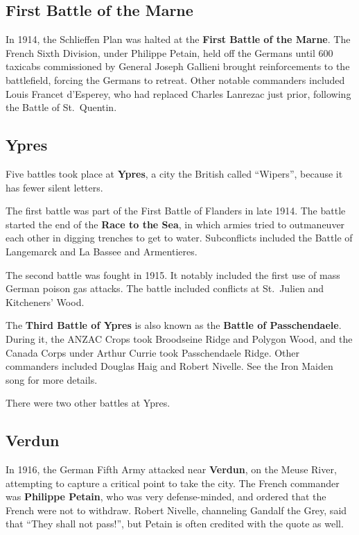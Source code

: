 \subsection*{First Battle of the Marne}

In 1914, the Schlieffen Plan was halted at the \textbf{First Battle of the Marne}.
The French Sixth Division, under Philippe Petain,
held off the Germans until 600 taxicabs commissioned by General Joseph Gallieni
brought reinforcements to the battlefield,
forcing the Germans to retreat.
Other notable commanders included Louis Francet d'Esperey,
who had replaced Charles Lanrezac just prior, following the Battle of St.\ Quentin.

\subsection*{Ypres}

Five battles took place at \textbf{Ypres}, a city the British called ``Wipers'',
because it has fewer silent letters.

The first battle was part of the First Battle of Flanders in late 1914.
The battle started the end of the \textbf{Race to the Sea},
in which armies tried to outmaneuver each other in digging trenches to get to water.
Subconflicts included the Battle of Langemarck and La Bassee and Armentieres.

The second battle was fought in 1915.
It notably included the first use of mass German poison gas attacks.
The battle included conflicts at St.\ Julien and Kitcheners' Wood.

The \textbf{Third Battle of Ypres} is also known as the \textbf{Battle of Passchendaele}.
During it, the ANZAC Crops took Broodseine Ridge and Polygon Wood,
and the Canada Corps under Arthur Currie took Passchendaele Ridge.
Other commanders included Douglas Haig and Robert Nivelle.
See the Iron Maiden song for more details.

There were two other battles at Ypres.

\subsection*{Verdun}

In 1916, the German Fifth Army attacked near \textbf{Verdun}, on the Meuse River,
attempting to capture a critical point to take the city.
The French commander was \textbf{Philippe Petain}, who was very defense-minded,
and ordered that the French were not to withdraw.
Robert Nivelle, channeling Gandalf the Grey, said that ``They shall not pass!'',
but Petain is often credited with the quote as well.

